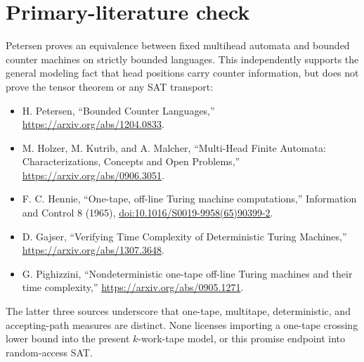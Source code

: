 \documentclass[11pt]{article}
\begin{document}
\section{Primary-literature check}
Petersen proves an equivalence between fixed multihead automata and bounded
counter machines on strictly bounded languages.  This independently supports
the general modeling fact that head positions carry counter information, but
does not prove the tensor theorem or any SAT transport:
\begin{itemize}
\item H. Petersen, ``Bounded Counter Languages,''
  \url{https://arxiv.org/abs/1204.0833}.
\item M. Holzer, M. Kutrib, and A. Malcher, ``Multi-Head Finite Automata:
  Characterizations, Concepts and Open Problems,''
  \url{https://arxiv.org/abs/0906.3051}.
\item F. C. Hennie, ``One-tape, off-line Turing machine computations,''
  Information and Control 8 (1965),
  \href{https://doi.org/10.1016/S0019-9958(65)90399-2}{doi:10.1016/S0019-9958(65)90399-2}.
\item D. Gajser, ``Verifying Time Complexity of Deterministic Turing
  Machines,'' \url{https://arxiv.org/abs/1307.3648}.
\item G. Pighizzini, ``Nondeterministic one-tape off-line Turing machines and
  their time complexity,'' \url{https://arxiv.org/abs/0905.1271}.
\end{itemize}
The latter three sources underscore that one-tape, multitape, deterministic,
and accepting-path measures are distinct.  None licenses importing a
one-tape crossing lower bound into the present $k$-work-tape model, or this
promise endpoint into random-access SAT.
\end{document}
